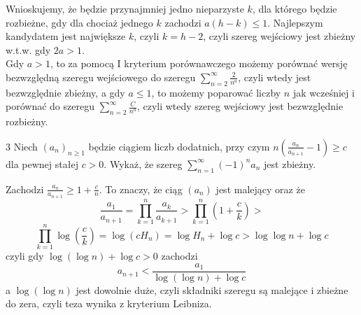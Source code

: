 \documentclass{../note}
\begin{document}
\begin{rozwiazanie}
\begin{enumerate}[label=(\alph*)]
    Wnioskujemy, że będzie przynajmniej jedno nieparzyste $k$, dla którego będzie rozbieżne, gdy dla chociaż jednego $k$ zachodzi $a(h-k)\leq1$. Najlepszym kandydatem jest największe $k$, czyli $k = h-2$, czyli szereg wejściowy jest zbieżny w.t.w. gdy $2a > 1$.\\
    Gdy $a > 1$, to za pomocą I kryterium porównawczego możemy porównać wersję bezwzględną szeregu wejściowego do szeregu $\sum_{n=2}^{\infty} \frac{2}{n^a}$, czyli wtedy jest bezwzględnie zbieżny, a gdy $a \leq 1$, to możemy poparować liczby $n$ jak wcześniej i porównać do szeregu $\sum_{n=2}^{\infty} \frac{C}{n^a}$, czyli wtedy szereg wejściowy jest bezwzględnie rozbieżny.
\end{enumerate}
\end{rozwiazanie}

\begin{zadanie}{3}
Niech $(a_{n})_{n\ge1}$ będzie ciągiem liczb dodatnich, przy czym $n\left(\frac{a_{n}}{a_{n+1}}-1\right)\ge c$ dla pewnej stałej $c>0$. Wykaż, że szereg $\sum_{n=1}^{\infty}(-1)^{n}a_{n}$ jest zbieżny.
\end{zadanie}
\begin{rozwiazanie}
Zachodzi $\frac{a_{n}}{a_{n+1}} \ge 1 + \frac{c}{n}$. To znaczy, że ciąg $(a_n)$ jest malejący oraz że
$$ \frac{a_1}{a_{n+1}} = \prod_{k=1}^{n}\frac{a_k}{a_{k+1}} > \prod_{k=1}^{n}\left(1+\frac{c}{k}\right) >$$ $$ \prod_{k=1}^{n} \log\left(\frac{c}{k}\right) = \log(c H_n) = \log H_n + \log c > \log\log n + \log c$$
czyli gdy $\log(\log n) + \log c > 0$ zachodzi
$$ a_{n+1} < \frac{a_1}{\log(\log n) + \log c} $$
a $\log(\log n)$ jest dowolnie duże, czyli składniki szeregu są malejące i zbieżne do zera, czyli teza wynika z kryterium Leibniza.
\end{rozwiazanie}
\end{document}
